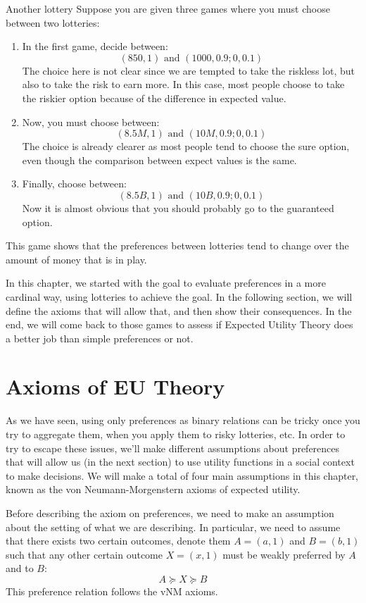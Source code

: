 \documentclass[12pt]{report}
\begin{document}
\begin{bclogo}[couleur=blue!10, arrondi=0.1, logo=.,ombre=false]{Another lottery}
Suppose you are given three games where you must choose between two lotteries:\begin{enumerate}
\item In the first game, decide between: $$(850, 1) \text{ and } (1000, 0.9 ; 0, 0.1)$$ The choice here is not clear since we are tempted to take the riskless lot, but also to take the risk to earn more. In this case, most people choose to take the riskier option because of the difference in expected value.
\item Now, you must choose between: $$(8.5M, 1) \text{ and } (10M, 0.9 ; 0, 0.1)$$ The choice is already clearer as most people tend to choose the sure option, even though the comparison between expect values is the same.
\item Finally, choose between: $$ (8.5B, 1) \text{ and } (10B, 0.9 ; 0, 0.1)$$ Now it is almost obvious that you should probably go to the guaranteed option.
\end{enumerate} This game shows that the preferences between lotteries tend to change over the amount of money that is in play. \end{bclogo}

In this chapter, we started with the goal to evaluate preferences in a more cardinal way, using lotteries to achieve the goal. In the following section, we will define the axioms that will allow that, and then show their consequences. In the end, we will come back to those games to assess if Expected Utility Theory does a better job than simple preferences or not.

\section{Axioms of EU Theory}

As we have seen, using only preferences as binary relations can be tricky once you try to aggregate them, when you apply them to risky lotteries, etc. In order to try to escape these issues, we'll make different assumptions about preferences that will allow us (in the next section) to use utility functions in a social context to make decisions. We will make a total of four main assumptions in this chapter, known as the von Neumann-Morgenstern axioms of expected utility.

Before describing the axiom on preferences, we need to make an assumption about the setting of what we are describing. In particular, we need to assume that there exists two certain outcomes, denote them $A = (a,1)$ and $B = (b, 1)$ such that any other certain outcome $X = (x, 1)$ must be weakly preferred by $A$ and to $B$: $$A\succeq X\succeq B$$ This preference relation follows the vNM axioms.
\end{document}
